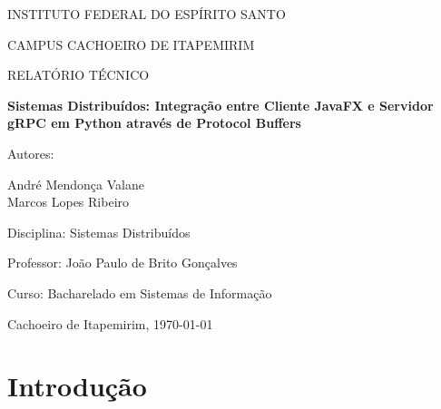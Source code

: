 \documentclass[12pt,a4paper]{article}
\begin{document}
\hypersetup{pageanchor=false}
\begin{titlepage}
\singlespacing

\centering

\vspace*{1cm}

{\LARGE INSTITUTO FEDERAL DO ESPÍRITO SANTO \par}

\vspace{0.5cm}

{\large CAMPUS CACHOEIRO DE ITAPEMIRIM \par}

\vspace{1.5cm}

{\Large RELATÓRIO TÉCNICO \par}

\vspace{1.5cm}

{\Large \textbf{Sistemas Distribuídos: Integração entre Cliente JavaFX e Servidor gRPC em Python através de Protocol Buffers} \par}

\vspace{2cm}

{\large Autores: \par}
\vspace{0.3cm}
{\large André Mendonça Valane \\ Marcos Lopes Ribeiro \par}

\vspace{2cm}

{\large Disciplina: Sistemas Distribuídos \par}
\vspace{0.3cm}
{\large Professor: João Paulo de Brito Gonçalves \par}
\vspace{0.3cm}
{\large Curso: Bacharelado em Sistemas de Informação \par}

\vspace{2cm}

{\large Cachoeiro de Itapemirim, \today \par}

\end{titlepage}

\newpage
\hypersetup{pageanchor=true}

\section{Introdução}
\end{document}
